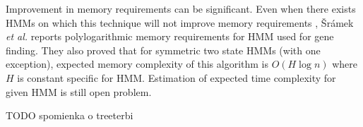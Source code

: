 Improvement in memory requirements can be significant. Even when there exists
HMMs on which this technique will not improve memory requirements
\cite{Sramek2007}, {\v S}r{\'a}mek {\it et al.} reports polylogarithmic 
memory requirements for HMM used for gene finding.
They also proved that for symmetric two
state HMMs (with one exception), expected memory complexity of this algorithm is
$O(H\log n)$ where $H$ is constant specific for HMM. Estimation of expected time
complexity for given HMM is still open problem.

TODO spomienka o treeterbi
